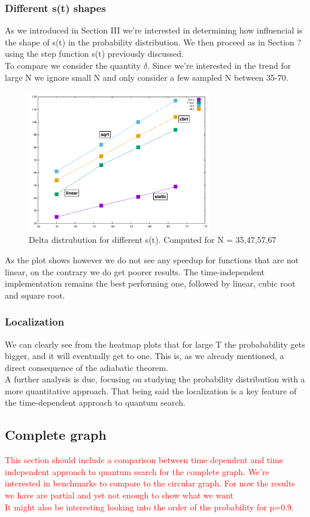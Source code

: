 \documentclass[aps,pra,reprint, onecolumn]{revtex4-2}
\newcommand{\red}[1]{\textcolor{red}{#1}}
\begin{document}
\subsubsection{\textbf{Different s(t) shapes}}
As we introduced in Section III we're interested in determining how influencial is the shape of s(t) in the probability distribution. We then proceed as in Section ? using the step function s(t) previously discussed. \\ To compare we consider the quantity $\delta$. Since we're interested in the trend for large N we ignore small N and only consider a few sampled N between 35-70.

\begin{figure}[ht]
\includegraphics[width=8cm]{./figures/s(t).pdf}
\caption{Delta distrubution for different s(t). Computed for N = 35,47,57,67}
\end{figure}

As the plot shows however we do not see any speedup for functions that are not linear, on the contrary we do get poorer results. The time-independent implementation remains the best performing one, followed by linear, cubic root and square root. 

\subsubsection{\textbf{Localization}}
We can clearly see from the heatmap plots that for large T the probabability gets bigger, and it will eventually get to one. This is, as we already mentioned, a direct consequence of the adiabatic theorem. \\ A further analysis is due, focusing on studying the probability distribution with a more quantitative approach. That being said the localization is a key feature of the time-dependent approach to quantum search. 

\subsection{Complete graph}
\red{This section should include a comparison between time dependent and time independent approach to quantum search for the complete graph. We're interested in benchmarks to compare to the circular graph. For now the results we have are partial and yet not enough to show what we want\\ It might also be interesting looking into the order of the probability for p=0.9.}
\end{document}
